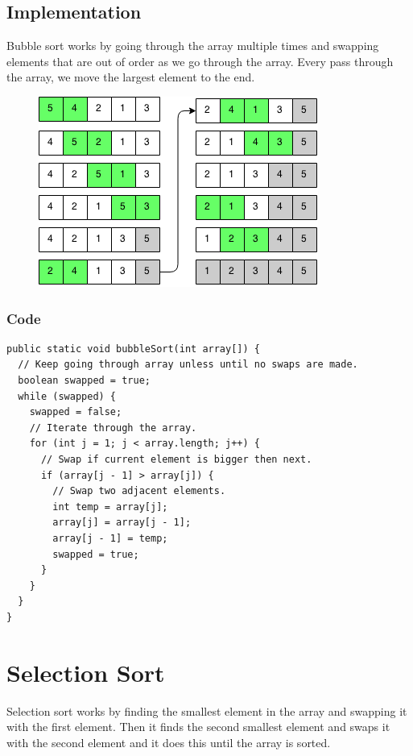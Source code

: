 \documentclass[11pt,oneside]{book}
\makeatletter
\def\maxwidth#1{\ifdim\Gin@nat@width>#1 #1\else\Gin@nat@width\fi}
\makeatother
\begin{document}
\subsection{Implementation}

Bubble sort works by going through the array multiple times and swapping elements that are out of order as we go through the array. Every pass through the array, we move the largest element to the end.

\vspace{5px}\begin{figure}[H]\centering
        \includegraphics[width=0.66\maxwidth{\textwidth}]{bubble_sort.png}
        \end{figure}

\subsubsection{Code}

\begin{lstlisting}
public static void bubbleSort(int array[]) {
  // Keep going through array unless until no swaps are made.
  boolean swapped = true;
  while (swapped) {
    swapped = false;
    // Iterate through the array.
    for (int j = 1; j < array.length; j++) {
      // Swap if current element is bigger then next.
      if (array[j - 1] > array[j]) {
        // Swap two adjacent elements.
        int temp = array[j];
        array[j] = array[j - 1];
        array[j - 1] = temp;
        swapped = true;
      }
    }
  }
}
\end{lstlisting}

        \section{ Selection Sort }
        

Selection sort works by finding the smallest element in the array and swapping it with the first element. Then it finds the second smallest element and swaps it with the second element and it does this until the array is sorted.
\end{document}
